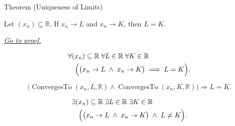 \begin{theorembox}{Theorem (Uniqueness of Limits)}
\begin{theorem}
\label{thm:uniqueness-of-limits}

Let $(x_n) \subseteq \mathbb{R}$. If $x_n \to L$ and $x_n \to K$, then
$L = K$.

\smallskip
\noindent
\hyperref[prf:uniqueness-of-limits]{\textit{Go to proof.}}
\end{theorem}
\end{theorembox}

\begin{remark*}
\[
\begin{aligned}
&\forall (x_n) \subseteq \mathbb{R} \;\forall L \in \mathbb{R}
\;\forall K \in \mathbb{R}\\
&\quad\Bigl(
    \bigl(x_n \to L \;\land\; x_n \to K\bigr)
    \;\Longrightarrow\;
    L = K
\Bigr).
\end{aligned}
\]
\end{remark*}

\begin{remark*}
\[
\bigl(\operatorname{ConvergesTo}(x_n,L,\mathbb{R})
\land
\operatorname{ConvergesTo}(x_n,K,\mathbb{R})\bigr)
\Longrightarrow L=K.
\]
\end{remark*}

\begin{remark*}
\[
\begin{aligned}
&\exists (x_n) \subseteq \mathbb{R} \;\exists L \in \mathbb{R}
\;\exists K \in \mathbb{R}\\
&\quad\Bigl(
    \bigl(x_n \to L \;\land\; x_n \to K\bigr)
    \;\land\;
    L \neq K
\Bigr).
\end{aligned}
\]
\end{remark*}

